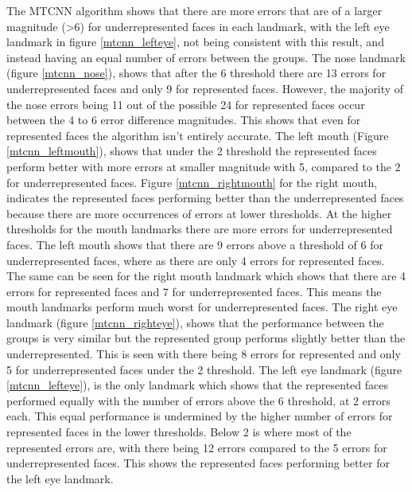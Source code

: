 \documentclass{l4proj}
\begin{document}
The MTCNN algorithm shows that there are more errors that are of a larger magnitude (>6) for underrepresented faces in each landmark, with the left eye landmark in figure \ref{mtcnn_lefteye}, not being consistent with this result, and instead having an equal number of errors between the groups. The nose landmark (figure \ref{mtcnn_nose}), shows that after the 6 threshold there are 13 errors for underrepresented faces and only 9 for represented faces. However, the majority of the nose errors being 11 out of the possible 24 for represented faces occur between the 4 to 6 error difference magnitudes. This shows that even for represented faces the algorithm isn't entirely accurate. The left mouth (Figure \ref{mtcnn_leftmouth}), shows that under the 2 threshold the represented faces perform better with more errors at smaller magnitude with 5, compared to the 2 for underrepresented faces. Figure \ref{mtcnn_rightmouth} for the right mouth, indicates the represented faces performing better than the underrepresented faces because there are more occurrences of errors at lower thresholds. At the higher thresholds for the mouth landmarks there are more errors for underrepresented faces. The left mouth shows that there are 9 errors above a threshold of 6 for underrepresented faces, where as there are only 4 errors for represented faces. The same can be seen for the right mouth landmark which shows that there are 4 errors for represented faces and 7 for underrepresented faces. This means the mouth landmarks perform much worst for underrepresented faces. The right eye landmark (figure \ref{mtcnn_righteye}), shows that the performance between the groups is very similar but the represented group performs slightly better than the underrepresented. This is seen with there being 8 errors for represented and only 5 for underrepresented faces under the 2 threshold. The left eye landmark (figure \ref{mtcnn_lefteye}), is the only landmark which shows that the represented faces performed equally with the number of errors above the 6 threshold, at 2 errors each. This equal performance is undermined by the higher number of errors for represented faces in the lower thresholds. Below 2 is where most of the represented errors are, with there being 12 errors compared to the 5 errors for underrepresented faces. This shows the represented faces performing better for the left eye landmark. 
\end{document}
